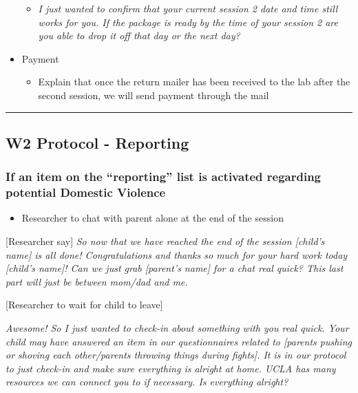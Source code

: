 \documentclass[]{book}
\providecommand{\tightlist}{%
  \setlength{\itemsep}{0pt}\setlength{\parskip}{0pt}}
\begin{document}
\begin{itemize}
  \begin{itemize}
  \tightlist
  \item
    \emph{I just wanted to confirm that your current session 2 date and time still works for you. If the package is ready by the time of your session 2 are you able to drop it off that day or the next day?}
  \end{itemize}
\item
  Payment

  \begin{itemize}
  \tightlist
  \item
    Explain that once the return mailer has been received to the lab after the second session, we will send payment through the mail
  \end{itemize}
\end{itemize}

\begin{center}\rule{0.5\linewidth}{0.5pt}\end{center}

\hypertarget{w2-protocol---reporting}{%
\subsection{W2 Protocol - Reporting}\label{w2-protocol---reporting}}

\hypertarget{if-an-item-on-the-reporting-list-is-activated-regarding-potential-domestic-violence-1}{%
\subsubsection{If an item on the ``reporting'' list is activated regarding potential Domestic Violence}\label{if-an-item-on-the-reporting-list-is-activated-regarding-potential-domestic-violence-1}}

\begin{itemize}
\tightlist
\item
  Researcher to chat with parent alone at the end of the session
\end{itemize}

{[}Researcher say{]} \emph{So now that we have reached the end of the session {[}child's name{]} is all done! Congratulations and thanks so much for your hard work today {[}child's name{]}! Can we just grab {[}parent's name{]} for a chat real quick? This last part will just be between mom/dad and me.}

{[}Researcher to wait for child to leave{]}

\emph{Awesome! So I just wanted to check-in about something with you real quick. Your child may have answered an item in our questionnaires related to {[}parents pushing or shoving each other/parents throwing things during fights{]}. It is in our protocol to just check-in and make sure everything is alright at home. UCLA has many resources we can connect you to if necessary. Is everything alright?}
\end{document}
